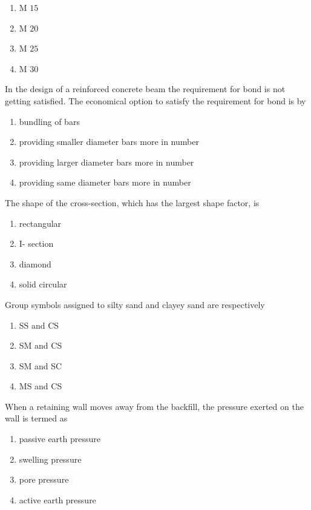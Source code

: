 \begin{enumerate}
	\item M $15$
	\item M $20$
	\item M $25$
	\item M $30$
\end{enumerate}

\item In the design of a reinforced concrete beam the requirement for bond is not getting satisfied. The economical option to satisfy the requirement for bond is by

\begin{enumerate}
	\item bundling of bars
	\item providing smaller diameter bars more in number
	\item providing larger diameter bars more in number
	\item providing same diameter bars more in number
\end{enumerate}

\item The shape of the cross-section, which has the largest shape factor, is

\begin{enumerate}
	\item rectangular
	\item I- section
	\item diamond
	\item solid circular
\end{enumerate}

\item Group symbols assigned to silty sand and clayey sand are respectively

\begin{enumerate}
	\item SS and CS
	\item SM and CS
	\item SM and SC
	\item MS and CS
\end{enumerate}

\item When a retaining wall moves away from the backfill, the pressure exerted on the wall is termed as

\begin{enumerate}
	\item passive earth pressure
	\item swelling pressure
	\item pore pressure
	\item active earth pressure
\end{enumerate}

